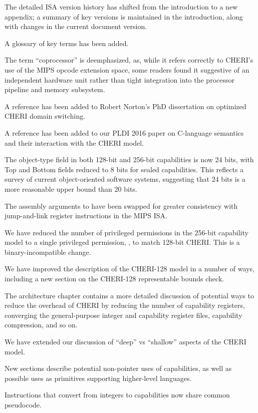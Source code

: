 \begin{description}
  The detailed ISA version history has shifted from the introduction to a new
  appendix; a summary of key versions is maintained in the introduction, along
  with changes in the current document version.

  A glossary of key terms has been added.

  The term ``coprocessor'' is deemphasized, as, while it refers correctly to
  CHERI's use of the MIPS opcode extension space, some readers found it
  suggestive of an independent hardware unit rather than tight integration into
  the processor pipeline and memory subsystem.

  A reference has been added to Robert Norton's PhD dissertation on optimized
  CHERI domain switching.

  A reference has been added to our PLDI 2016 paper on C-language semantics and
  their interaction with the CHERI model.

  The object-type field in both 128-bit and 256-bit capabilities is now 24 bits,
  with Top and Bottom fields reduced to 8 bits for sealed capabilities.
  This reflects a survey of current object-oriented software systems, suggesting
  that 24 bits is a more reasonable upper bound than 20 bits.

  The assembly arguments to  have been swapped for greater
  consistency with jump-and-link register instructions in the MIPS ISA.

  We have reduced the number of privileged permissions in the 256-bit capability
  model to a single privileged permission, \cappermASR, to match
  128-bit CHERI.
  This is a binary-incompatible change.

  We have improved the description of the CHERI-128 model in a number of ways,
  including a new section on the CHERI-128 representable bounds check.

  The architecture chapter contains a more detailed discussion of potential ways
  to reduce the overhead of CHERI by reducing the number of capability
  registers, converging the general-purpose integer and capability register files,
  capability compression, and so on.

  We have extended our discussion of ``deep'' vs ``shallow'' aspects of the
  CHERI model.

  New sections describe potential non-pointer uses of capabilities, as well as
  possible uses as primitives supporting higher-level languages.

  Instructions that convert from integers to capabilities now share common
   pseudocode.


\end{description}
